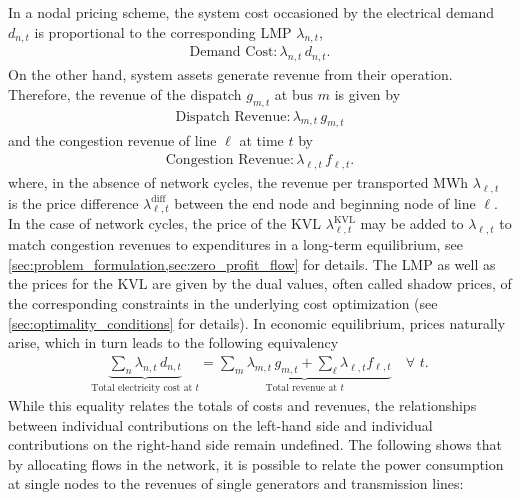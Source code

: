 \documentclass[11pt,twocolumn]{article}
\newcommand{\Forall}[1]{\hspace{10pt} \forall \,\, #1 }
\newcommand{\nodalgeneration}[1][n]{g_{#1,t}}
\newcommand{\flow}{f_{\ell,t}}
\newcommand{\lmp}[1][n]{\lambda_{#1,t}}
\newcommand{\lmpdiff}[1][\ell]{\lmp[#1]^\text{diff}}
\newcommand{\lmpkvl}[1][\ell]{\lmp[#1]^\text{KVL}}
\newcommand{\demand}[1][n]{d_{#1,t}}
\newcommand{\incidence}[1][n]{K_{#1,\ell}}
\begin{document}
In a nodal pricing scheme, the system cost occasioned by the electrical demand $\demand$ is proportional to the corresponding \ac{LMP} $\lmp$,
\begin{align}
    \text{Demand Cost}: \lmp\, \demand .
    \label{eq:demand_cost}
\end{align}
On the other hand, system assets generate revenue from their operation. Therefore, the revenue of the dispatch $\nodalgeneration[m]$ at bus $m$ is given by
\begin{align}
    \text{Dispatch Revenue}: \lmp[m] \, \nodalgeneration[m]
    \label{eq:dispatch_revenue}
\end{align}
and the congestion revenue of line $\ell$ at time $t$ by
\begin{align}
    \text{Congestion Revenue}: \lmp[\ell]\, \flow .
    \label{eq:congestion_revenue}
\end{align}
where, in the absence of network cycles, the revenue per transported MWh $\lmp[\ell]$ is the price difference $\lmpdiff$ between the end node and beginning node of line $\ell$. In the case of network cycles, the price of the \ac{KVL} $\lmpkvl$ may be added to $\lmp[\ell]$ to match congestion revenues to expenditures in a long-term equilibrium, see \cref{sec:problem_formulation,sec:zero_profit_flow} for details. The \ac{LMP} as well as the prices for the \ac{KVL} are given by the dual values, often called shadow prices, of the corresponding constraints in the underlying cost optimization (see \cref{sec:optimality_conditions} for details).
In economic equilibrium, prices naturally arise, which in turn leads to the following equivalency
\begin{align}
    \underbrace{\sum_{n} \lmp\, \demand}_{\text{Total electricity cost at $t$}}  = \underbrace{\sum_{m} \lmp[m]\, \nodalgeneration[m] + \sum_{\ell} \lmp[\ell] \flow}_{\text{Total revenue at $t$}}\, \Forall{t} .
    \label{eq:total-demand-cost}
\end{align}
While this equality relates the totals of costs and revenues, the relationships between individual contributions on the left-hand side and individual contributions on the right-hand side remain undefined. The following shows that by allocating flows in the network, it is possible to relate the power consumption at single nodes to the revenues of single generators and transmission lines:
\end{document}
